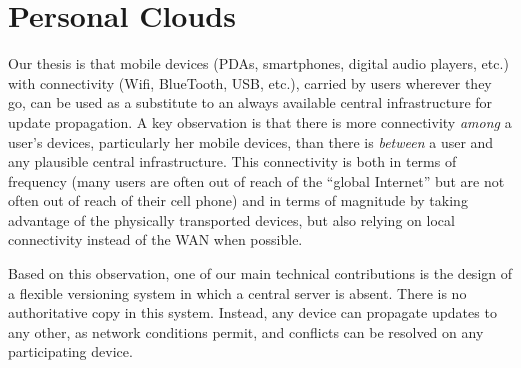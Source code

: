 


\section{Personal Clouds}
\label{sec:model}

Our thesis is that mobile devices (PDAs, smartphones, digital audio
players, etc.) with connectivity (Wifi, BlueTooth, USB, etc.), carried
by users wherever they go, can be used as a substitute to an always
available central infrastructure for update propagation. A key
observation is that there is more connectivity \emph{among} a user's
devices, particularly her mobile devices, than there is \emph{between}
a user and any plausible central infrastructure. This connectivity is
both in terms of frequency (many users are often out of reach of the
``global Internet'' but are not often out of reach of their cell
phone) and in terms of magnitude by taking advantage of the physically
transported devices, but also relying on local connectivity instead
of the WAN when possible.


Based on this observation, one of our main technical contributions is the design of a
flexible versioning system in which a central server is absent.
There is no authoritative copy in this system. 
Instead, any device can propagate updates to any other, as network
conditions permit, and conflicts can be resolved on any participating 
device. 

